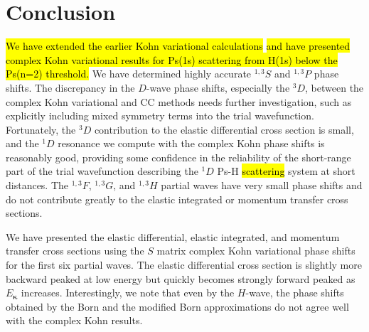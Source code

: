\documentclass[preprint,showpacs,showkeys,preprintnumbers,amsmath,amssymb,longbibliography,pra,aps]{revtex4-1}
\begin{document}
{\section{Conclusion}
\hl{We have extended the earlier Kohn variational calculations} \cite{VanReeth2003,VanReeth2004}
\hl{and have presented complex Kohn variational results for Ps(1s) scattering from H(1s)
below the Ps(n=2) threshold.}
We have determined highly accurate $^{1,3}S$ and $^{1,3}P$ phase shifts.
The discrepancy in the $D$-wave phase shifts, especially the $^3D$, between the 
complex Kohn variational and CC methods needs further investigation, such as 
explicitly including mixed symmetry terms into the trial wavefunction.
Fortunately, the $^3D$ contribution to the elastic differential 
cross section is small, and the $^1D$ resonance we compute with the complex Kohn 
phase shifts is reasonably good, providing some confidence in the reliability 
of the short-range part of the trial wavefunction describing the $^1D$ Ps-H 
\hl{scattering} system at short distances. The $^{1,3}F$, $^{1,3}G$, and $^{1,3}H$ partial
waves have very small phase shifts and do not contribute greatly to the
elastic integrated or momentum transfer cross sections.

We have presented the elastic differential, elastic integrated, and momentum 
transfer cross sections using the $S$ matrix 
complex Kohn variational phase shifts for the first six partial waves.
The elastic differential cross section is slightly more backward peaked at
low energy but quickly becomes strongly forward peaked as $E_{\bm \kappa}$
increases.
Interestingly, we note that even by the $H$-wave, the phase shifts obtained 
by the Born and the modified Born approximations do not agree well with the 
complex Kohn results.

}
\end{document}
